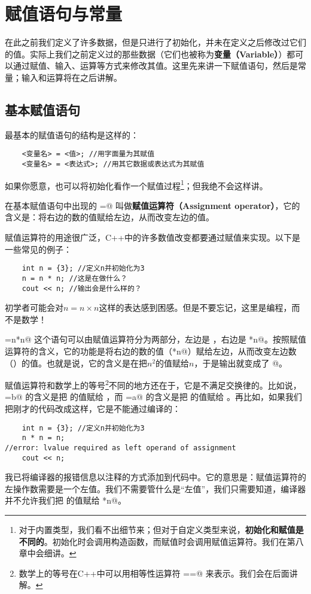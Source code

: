 \section{赋值语句与常量}
在此之前我们定义了许多数据，但是只进行了初始化，并未在定义之后修改过它们的值。实际上我们之前定义过的那些数据（它们也被称为\textbf{变量（Variable）}）都可以通过赋值、输入、运算等方式来修改其值。这里先来讲一下赋值语句，然后是常量；输入和运算将在之后讲解。\par
\subsection*{基本赋值语句}
最基本的赋值语句的结构是这样的：
\begin{lstlisting}
    <变量名> = <值>; //用字面量为其赋值
    <变量名> = <表达式>; //用其它数据或表达式为其赋值
\end{lstlisting}
如果你愿意，也可以将初始化看作一个赋值过程\footnote{对于内置类型，我们看不出细节来；但对于自定义类型来说，\textbf{初始化和赋值是不同的}。初始化时会调用构造函数，而赋值时会调用赋值运算符。我们在第八章中会细讲。}；但我绝不会这样讲。\par
在基本赋值语句中出现的 \lstinline@=@ 叫做\textbf{赋值运算符（Assignment operator）}，它的含义是：将右边的数的值赋给左边，从而改变左边的值。\par
赋值运算符的用途很广泛，C++中的许多数值改变都要通过赋值来实现。以下是一些常见的例子：
\begin{lstlisting}
    int n = {3}; //定义n并初始化为3
    n = n * n; //这是在做什么？
    cout << n; //输出会是什么样的？
\end{lstlisting}
初学者可能会对$n=n\times n$这样的表达感到困感。但是不要忘记，这里是编程，而不是数学！\par
\lstinline@n=n*n@ 这个语句可以由赋值运算符分为两部分，左边是 \lstinline@n@，右边是 \lstinline@n*n@。按照赋值运算符的含义，它的功能是将右边的数的值（\lstinline@n*n@）赋给左边，从而改变左边数（\lstinline@n@）的值。也就是说，它的含义是在把$n^2$的值赋给$n$，于是输出就变成了 @。\par
赋值运算符和数学上的等号\footnote{数学上的等号在C++中可以用相等性运算符 \lstinline@==@ 来表示。我们会在后面讲解。}不同的地方还在于，它是不满足交换律的。比如说，\lstinline@a=b@ 的含义是把 \lstinline@b@ 的值赋给 \lstinline@a@，而 \lstinline@b=a@ 的含义是把 \lstinline@a@ 的值赋给 \lstinline@b@。再比如，如果我们把刚才的代码改成这样，它是不能通过编译的：
\begin{lstlisting}
    int n = {3}; //定义n并初始化为3
    n * n = n;
//error: lvalue required as left operand of assignment
    cout << n;
\end{lstlisting}
我已将编译器的报错信息以注释的方式添加到代码中。它的意思是：赋值运算符的左操作数需要是一个左值。我们不需要管什么是``左值''，我们只需要知道，编译器并不允许我们把 \lstinline@n@ 的值赋给 \lstinline@n*n@。\par
